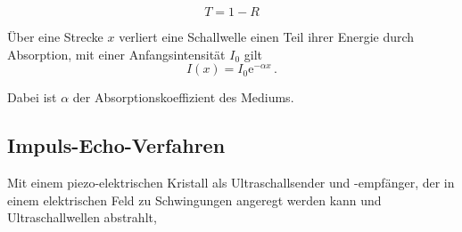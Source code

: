 \begin{equation}
    T = 1 - R
    \label{eq:transmisskoeff}
\end{equation}


Über eine Strecke $x$ verliert eine Schallwelle einen Teil ihrer
Energie durch Absorption, mit einer Anfangsintensität $I_0$ gilt
\begin{equation}
    I(x) = I_0 \mathrm{e}^{-\alpha x} \,.
\end{equation}

Dabei ist $\alpha$ der Absorptionskoeffizient des Mediums.

\subsection{Impuls-Echo-Verfahren}

Mit einem piezo-elektrischen Kristall als Ultraschallsender und
-empfänger, der in einem elektrischen Feld zu Schwingungen
angeregt werden kann und Ultraschallwellen abstrahlt,



